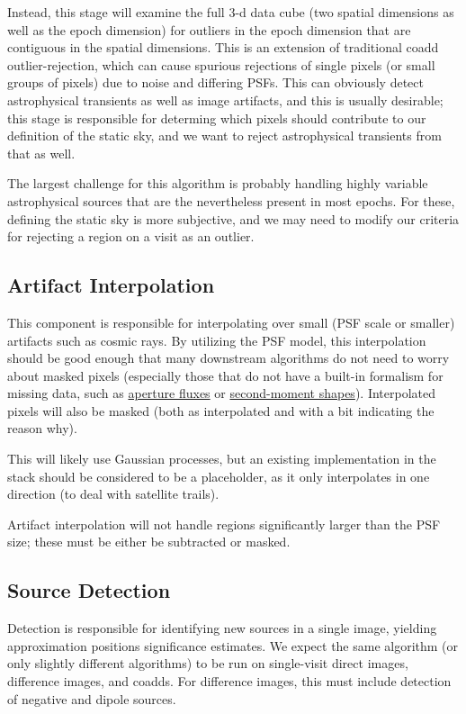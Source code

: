 Instead, this stage will examine the full 3-d data cube (two spatial dimensions as well as the epoch dimension) for outliers in the epoch dimension that are contiguous in the spatial dimensions.  This is an extension of traditional coadd outlier-rejection, which can cause spurious rejections of single pixels (or small groups of pixels) due to noise and differing PSFs.  This can obviously detect astrophysical transients as well as image artifacts, and this is usually desirable; this stage is responsible for determing which pixels should contribute to our definition of the static sky, and we want to reject astrophysical transients from that as well.

The largest challenge for this algorithm is probably handling highly variable astrophysical sources that are the nevertheless present in most epochs.  For these, defining the static sky is more subjective, and we may need to modify our criteria for rejecting a region on a visit as an outlier.


\subsection{Artifact Interpolation}
\label{sec:acArtifactInterpolation}

This component is responsible for interpolating over small (PSF scale or smaller) artifacts such as cosmic rays.  By utilizing the PSF model, this interpolation should be good enough that many downstream algorithms do not need to worry about masked pixels (especially those that do not have a built-in formalism for missing data, such as \hyperref[sec:acAperturePhotometry]{aperture fluxes} or \hyperref[sec:acShapeAlgorithms]{second-moment shapes}).  Interpolated pixels will also be masked (both as interpolated and with a bit indicating the reason why).

This will likely use Gaussian processes, but an existing implementation in the stack should be considered to be a placeholder, as it only interpolates in one direction (to deal with satellite trails).

Artifact interpolation will not handle regions significantly larger than the PSF size; these must be either be subtracted or masked.


\subsection{Source Detection}
\label{sec:acSourceDetection}

Detection is responsible for identifying new sources in a single image, yielding approximation positions significance estimates.  We expect the same algorithm (or only slightly different algorithms) to be run on single-visit direct images, difference images, and coadds.  For difference images, this must include detection of negative and dipole sources.

